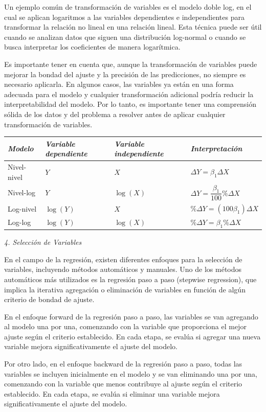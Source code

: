 \documentclass[
]{book}
\begin{document}
Un ejemplo común de transformación de variables es el modelo doble log,
en el cual se aplican logaritmos a las variables dependientes e
independientes para transformar la relación no lineal en una relación
lineal. Esta técnica puede ser útil cuando se analizan datos que siguen
una distribución log-normal o cuando se busca interpretar los
coeficientes de manera logarítmica.

Es importante tener en cuenta que, aunque la transformación de variables
puede mejorar la bondad del ajuste y la precisión de las predicciones,
no siempre es necesario aplicarla. En algunos casos, las variables ya
están en una forma adecuada para el modelo y cualquier transformación
adicional podría reducir la interpretabilidad del modelo. Por lo tanto,
es importante tener una comprensión sólida de los datos y del problema a
resolver antes de aplicar cualquier transformación de variables.

\begin{longtable}[]{@{}llll@{}}
\toprule
\emph{Modelo} & \emph{Variable dependiente} & \emph{Variable independiente} & \emph{Interpretación}\tabularnewline
\midrule
\endhead
Nivel-nivel & \(Y\) & \(X\) & \(\Delta Y = \beta_1 \Delta X\)\tabularnewline
Nivel-log & \(Y\) & \(\log(X)\) & \(\Delta Y = \dfrac{\beta_1}{100}\% \Delta X\)\tabularnewline
Log-nivel & \(\log(Y)\) & \(X\) & \(\%\Delta Y = (100\beta_1)\Delta X\)\tabularnewline
Log-log & \(\log(Y)\) & \(\log(X)\) & \(\%\Delta Y = \beta_1 \%\Delta X\)\tabularnewline
\bottomrule
\end{longtable}

\emph{4. Selección de Variables}

En el campo de la regresión, existen diferentes enfoques para la
selección de variables, incluyendo métodos automáticos y manuales. Uno
de los métodos automáticos más utilizados es la regresión paso a paso
(stepwise regression), que implica la iterativa agregación o eliminación
de variables en función de algún criterio de bondad de ajuste.

En el enfoque forward de la regresión paso a paso, las variables se van
agregando al modelo una por una, comenzando con la variable que
proporciona el mejor ajuste según el criterio establecido. En cada
etapa, se evalúa si agregar una nueva variable mejora significativamente
el ajuste del modelo.

Por otro lado, en el enfoque backward de la regresión paso a paso, todas
las variables se incluyen inicialmente en el modelo y se van eliminando
una por una, comenzando con la variable que menos contribuye al ajuste
según el criterio establecido. En cada etapa, se evalúa si eliminar una
variable mejora significativamente el ajuste del modelo.
\end{document}
